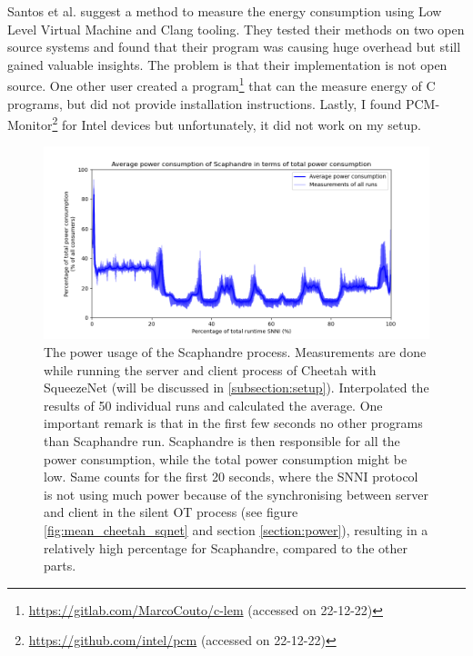 \documentclass[../thesis.tex]{subfiles}
\begin{document}
Santos et al. \parencite*{santos2017} suggest a method to measure the energy consumption using Low Level Virtual Machine and Clang tooling. They tested their methods on two open source systems and found that their program was causing huge overhead but still gained valuable insights. The problem is that their implementation is not open source. One other user created a program\footnote{\url{https://gitlab.com/MarcoCouto/c-lem} (accessed on 22-12-22)} that can the measure energy of C programs, but did not provide installation instructions. Lastly, I found PCM-Monitor\footnote{\url{https://github.com/intel/pcm} (accessed on 22-12-22)} for Intel devices but unfortunately, it did not work on my setup. 
\begin{figure}[t]
    \centering
    \includegraphics[width=\linewidth]{Thesis/Images/overhead_scaphandre.png}
    \caption{The power usage of the Scaphandre process. Measurements are done while running the server and client process of Cheetah with SqueezeNet (will be discussed in \autoref{subsection:setup}). Interpolated the results of 50 individual runs and calculated the average. One important remark is that in the first few seconds no other programs than Scaphandre run. Scaphandre is then responsible for all the power consumption, while the total power consumption might be low. Same counts for the first 20 seconds, where the SNNI protocol is not using much power because of the synchronising between server and client in the silent OT process (see figure \ref{fig:mean_cheetah_sqnet} and section \ref{section:power}), resulting in a relatively high percentage for Scaphandre, compared to the other parts.}
    \label{fig:overhead_scaphandre}
\end{figure}
\end{document}

